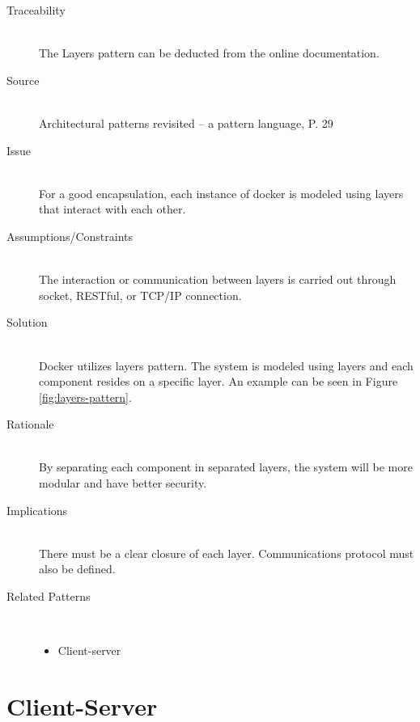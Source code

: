 \begin{description}
\item [Traceability]~\\
The Layers pattern can be deducted from the online documentation\cite{dockerarchi}.

\item [Source]~\\
Architectural patterns revisited -- a pattern language, P. 29 \cite{avgeriou2005architectural}

\item [Issue]~\\
For a good encapsulation, each instance of docker is modeled using layers that interact with each other.

\item [Assumptions/Constraints]~\\
The interaction or communication between layers is carried out through socket, RESTful, or TCP/IP connection.

\item [Solution]~\\
Docker utilizes layers pattern. The system is modeled using layers and each component resides on a specific layer. An example can be seen in Figure \ref{fig:layers-pattern}.

\item [Rationale] ~\\
By separating each component in separated layers, the system will be more modular and have better security.

\item [Implications]~\\
There must be a clear closure of each layer. Communications protocol must also be defined.

\item [Related Patterns]~\\
\begin{itemize}
	\item Client-server
\end{itemize}
\end{description}

\clearpage
\section{Client-Server}


